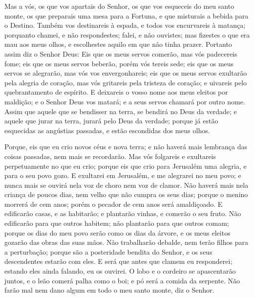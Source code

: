 Mas a vós, os que vos apartais do Senhor, os que vos esqueceis do
meu santo monte, os que preparais uma mesa para a Fortuna, e que
misturais a bebida para o Destino. Também vos destinareis à
espada, e todos vos encurvareis à matança; porquanto chamei, e não
respondestes; falei, e não ouvistes; mas fizestes o que era mau aos
meus olhos, e escolhestes aquilo em que não tinha prazer.
Portanto assim diz o Senhor Deus: Eis que os meus servos
comerão, mas vós padecereis fome; eis que os meus servos beberão,
porém vós tereis sede; eis que os meus servos se alegrarão, mas vós
vos envergonhareis; eis que os meus servos exultarão pela
alegria de coração, mas vós gritareis pela tristeza de coração; e
uivareis pelo quebrantamento de espírito. E deixareis o vosso
nome aos meus eleitos por maldição; e o Senhor Deus vos matará; e a
seus servos chamará por outro nome. Assim que aquele que se
bendisser na terra, se bendirá no Deus da verdade; e aquele que
jurar na terra, jurará pelo Deus da verdade; porque já estão
esquecidas as angústias passadas, e estão escondidas dos meus olhos.

Porque, eis que eu crio novos céus e nova terra; e não haverá
mais lembrança das coisas passadas, nem mais se recordarão.
Mas vós folgareis e exultareis perpetuamente no que eu crio;
porque eis que crio para Jerusalém uma alegria, e para o seu povo
gozo. E exultarei em Jerusalém, e me alegrarei no meu povo; e
nunca mais se ouvirá nela voz de choro nem voz de clamor. Não
haverá mais nela criança de poucos dias, nem velho que não cumpra os
seus dias; porque o menino morrerá de cem anos; porém o pecador de
cem anos será amaldiçoado. E edificarão casas, e as
habitarão; e plantarão vinhas, e comerão o seu fruto. Não
edificarão para que outros habitem; não plantarão para que outros
comam; porque os dias do meu povo serão como os dias da árvore, e os
meus eleitos gozarão das obras das suas mãos. Não trabalharão
debalde, nem terão filhos para a perturbação; porque são a
posteridade bendita do Senhor, e os seus descendentes estarão com
eles. E será que antes que clamem eu responderei; estando
eles ainda falando, eu os ouvirei. O lobo e o cordeiro se
apascentarão juntos, e o leão comerá palha como o boi; e pó será a
comida da serpente. Não farão mal nem dano algum em todo o meu santo
monte, diz o Senhor.

\medskip

